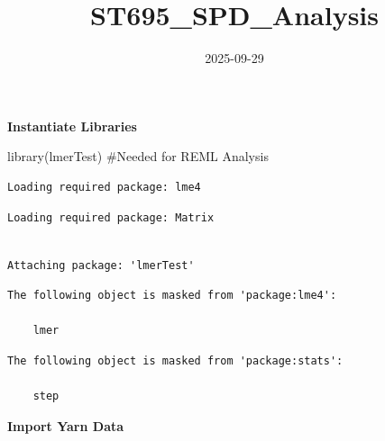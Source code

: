 \documentclass[
  letterpaper,
  DIV=11,
  numbers=noendperiod]{scrartcl}
\title{ST695\_SPD\_Analysis}
\author{}
\date{2025-09-29}
\newenvironment{Shaded}{\begin{snugshade}}{\end{snugshade}}
\newcommand{\AttributeTok}[1]{\textcolor[rgb]{0.40,0.45,0.13}{#1}}
\newcommand{\CommentTok}[1]{\textcolor[rgb]{0.37,0.37,0.37}{#1}}
\newcommand{\DecValTok}[1]{\textcolor[rgb]{0.68,0.00,0.00}{#1}}
\newcommand{\FunctionTok}[1]{\textcolor[rgb]{0.28,0.35,0.67}{#1}}
\newcommand{\NormalTok}[1]{\textcolor[rgb]{0.00,0.23,0.31}{#1}}
\newcommand{\OtherTok}[1]{\textcolor[rgb]{0.00,0.23,0.31}{#1}}
\newcommand{\SpecialCharTok}[1]{\textcolor[rgb]{0.37,0.37,0.37}{#1}}
\newcommand{\StringTok}[1]{\textcolor[rgb]{0.13,0.47,0.30}{#1}}
\begin{document}
\maketitle


\textbf{Instantiate Libraries}

\begin{Shaded}
\begin{Highlighting}[]
\FunctionTok{library}\NormalTok{(lmerTest) }\CommentTok{\#Needed for REML Analysis}
\end{Highlighting}
\end{Shaded}

\begin{verbatim}
Loading required package: lme4
\end{verbatim}

\begin{verbatim}
Loading required package: Matrix
\end{verbatim}

\begin{verbatim}

Attaching package: 'lmerTest'
\end{verbatim}

\begin{verbatim}
The following object is masked from 'package:lme4':

    lmer
\end{verbatim}

\begin{verbatim}
The following object is masked from 'package:stats':

    step
\end{verbatim}

\textbf{Import Yarn Data}

\begin{Shaded}
\end{Shaded}
\end{document}
